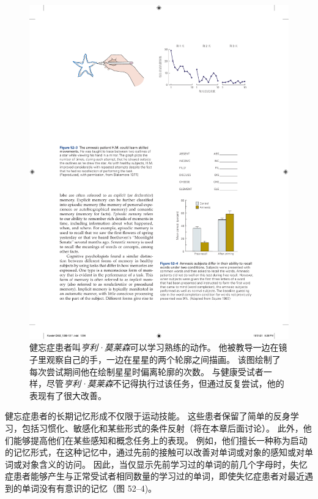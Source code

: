 \begin{figure}[htbp]
	\centering
	\includegraphics[width=0.8\linewidth]{chap52/fig_52_3}
	\caption{健忘症患者叫\textit{亨利·莫莱森}可以学习熟练的动作。
		他被教导一边在镜子里观察自己的手，一边在星星的两个轮廓之间描画。
		该图绘制了每次尝试期间他在绘制星星时偏离轮廓的次数。
		与健康受试者一样，尽管\textit{亨利·莫莱森}不记得执行过该任务，但通过反复尝试，他的表现有了很大改善\cite{blakemore1977mechanics}。}
	\label{fig:52_3}
\end{figure}


健忘症患者的长期记忆形成不仅限于运动技能。
这些患者保留了简单的反身学习，包括习惯化、敏感化和某些形式的条件反射（将在本章后面讨论）。
此外，他们能够提高他们在某些感知和概念任务上的表现。
例如，他们擅长一种称为启动的记忆形式，在这种记忆中，通过先前的接触可以改善对单词或对象的感知或对单词或对象含义的访问。
因此，当仅显示先前学习过的单词的前几个字母时，失忆症患者能够产生与正常受试者相同数量的学习过的单词，即使失忆症患者对最近遇到的单词没有有意识的记忆（图 52–4)。


